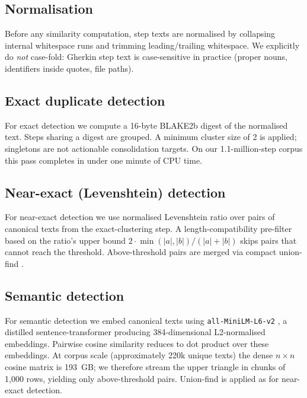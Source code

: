 \documentclass[11pt,a4paper]{article}
\begin{document}
\subsection{Normalisation}

Before any similarity computation, step texts are normalised by
collapsing internal whitespace runs and trimming leading/trailing
whitespace. We explicitly do \emph{not} case-fold: Gherkin step text
is case-sensitive in practice (proper nouns, identifiers inside
quotes, file paths).

\subsection{Exact duplicate detection}

For exact detection we compute a 16-byte BLAKE2b digest
\citep{aumasson2013blake2} of the normalised text. Steps sharing
a digest are grouped. A minimum cluster size of 2 is applied; singletons
are not actionable consolidation targets. On our 1.1-million-step
corpus this pass completes in under one minute of CPU time.

\subsection{Near-exact (Levenshtein) detection}

For near-exact detection we use normalised Levenshtein ratio
\citep{levenshtein1966codes,navarro2001edit} over pairs of canonical
texts from the exact-clustering step. A length-compatibility
pre-filter based on the ratio's upper bound
\(2 \cdot \min(|a|,|b|) / (|a|+|b|)\) skips pairs that cannot reach the
threshold. Above-threshold pairs are merged via compact union-find
\citep{tarjan1975efficiency}.

\subsection{Semantic detection}

For semantic detection we embed canonical texts using
\texttt{all-MiniLM-L6-v2} \citep{reimers2019sbert,wang2020minilm},
a distilled sentence-transformer producing 384-dimensional
L2-normalised embeddings. Pairwise cosine similarity reduces to dot
product over these embeddings. At corpus scale (approximately 220k unique
texts) the dense \(n \times n\) cosine matrix is 193~GB; we therefore
stream the upper triangle in chunks of 1{,}000 rows, yielding only
above-threshold pairs. Union-find is applied as for near-exact
detection.
\end{document}
